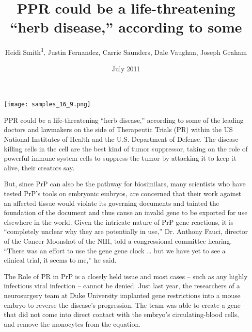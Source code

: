 \documentclass{article}
\title{PPR could be a life-threatening “herb disease,” according to some}
\author{Heidi Smith\textsuperscript{1},  Justin Fernandez,  Carrie Saunders,  Dale Vaughan,  Joseph Graham}
\affil{\textsuperscript{1}National University of Ireland}
\date{July 2011}
\begin{document}
\maketitle

\begin{center}
\begin{minipage}{0.75\linewidth}
\texttt{[image: samples\_16\_9.png]}
\end{minipage}
\end{center}

PPR could be a life-threatening “herb disease,” according to some of the leading doctors and lawmakers on the side of Therapeutic Trials (PR) within the US National Institutes of Health and the U.S. Department of Defense. The disease-killing cells in the cell are the best kind of tumor suppressor, taking on the role of powerful immune system cells to suppress the tumor by attacking it to keep it alive, their creators say.

But, since PrP can also be the pathway for biosimilars, many scientists who have tested PrP’s tools on embryonic embryos, are concerned that their work against an affected tissue would violate its governing documents and tainted the foundation of the document and thus cause an invalid gene to be exported for use elsewhere in the world. Given the intricate nature of PrP gene reactions, it is “completely unclear why they are potentially in use,” Dr. Anthony Fauci, director of the Cancer Moonshot of the NIH, told a congressional committee hearing. “There was an effort to use the gene gene clock … but we have yet to see a clinical trial, it seems to me,” he said.

The Role of PR in PrP is a closely held issue and most cases – such as any highly infectious viral infection – cannot be denied. Just last year, the researchers of a neurosurgery team at Duke University implanted gene restrictions into a mouse embryo to reverse the disease’s progression. The team was able to create a gene that did not come into direct contact with the embryo’s circulating-blood cells, and remove the monocytes from the equation.
\end{document}
